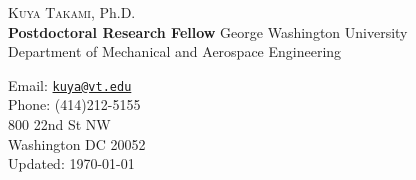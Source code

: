 \documentclass[11pt,letterpaper]{article}
\begin{document}
  \begin{minipage}{0.7\linewidth}
  {\vspace{1cm}\selectfont \Huge {\scshape Kuya Takami}, Ph.D.}\\
\vspace{5mm}
{\bf Postdoctoral Research Fellow} \quad George Washington University\\
Department of Mechanical and Aerospace Engineering\\

  \end{minipage}
  \hspace{2mm}
  \begin{minipage}{0.6\linewidth}
    \vspace{5mm}
  	Email:  \href{mailto:kuya@vt.edu}{\tt kuya@vt.edu} \\
    Phone:  (414)212-5155\\

    800 22nd St NW\\
    Washington DC 20052\\
    \vspace{5pt}
    Updated: \today
  \end{minipage}
\end{document}
